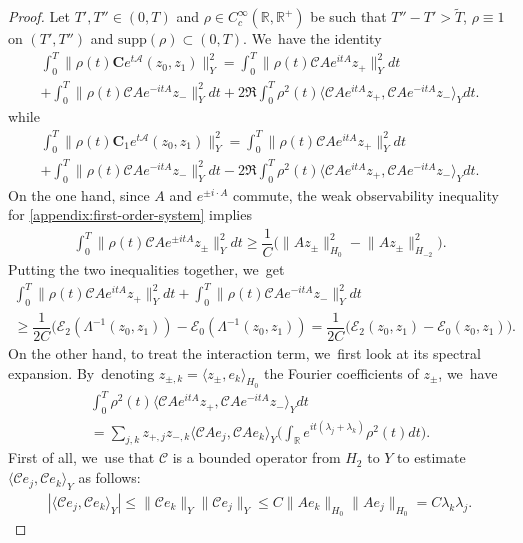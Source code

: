 \documentclass[JEP,XML,SOM,Unicode,published]{cedram}
\theoremstyle{definition}
\let\mc\mathcal
\let\ld\lambda
\newcommand{\A}{\mc{A}}
\newcommand{\E}{\mc{E}}
\newcommand{\R}{\mathbb{R}}
\newcommand{\bC}{\boldsymbol{C}}
\providecommand{\norm}[1]{\lVert#1\rVert}
\providecommand{\inn}[1]{\langle#1\rangle}
\begin{document}
\begin{proof}
Let $T',T'' \in (0,T)$ and $\rho \in C^\infty_c(\mathbb{R},\mathbb{R}^+)$
be such that $T''-T'>\widetilde{T}$, $\rho \equiv 1$ on $(T',T'')$ and $\text{supp}(\rho) \subset (0,T)$. We~have the identity
\begin{multline*}
\int_0^T \norm{\rho(t)\bC e^{t\A}(z_0, z_1)}_{Y}^2=\int_0^T \norm{\rho(t)\mc{C}Ae^{itA}z_+}_{Y}^2dt\\+\int_0^T \norm{\rho(t)\mc{C}Ae^{-itA}z_-}_{Y}^2dt+2\Re\int_0^T \rho^2(t)\inn{\mc{C}Ae^{itA}z_+, \mc{C}Ae^{-itA}z_-}_{Y}dt.
\end{multline*}
while
\begin{multline*}
\int_0^T \norm{\rho(t)\bC_1 e^{t\A}(z_0, z_1)}_{Y}^2=\int_0^T \norm{\rho(t)\mc{C}Ae^{itA}z_+}_{Y}^2dt\\+\int_0^T \norm{\rho(t)\mc{C}Ae^{-itA}z_-}_{Y}^2dt-2\Re\int_0^T \rho^2(t)\inn{\mc{C}Ae^{itA}z_+, \mc{C}Ae^{-itA}z_-}_{Y}dt.
\end{multline*}
On the one hand, since $A$ and $e^{\pm i\cdot A}$ commute, the weak observability inequality for \eqref{appendix:first-order-system} implies
\begin{align*}
\int_0^T \norm{\rho(t)\mc{C}Ae^{\pm itA}z_{\pm}}_{Y}^2dt\geq \dfrac{1}{C}\big(\norm{Az_\pm}_{H_0}^2-\norm{Az_\pm}_{H_{-2}}^2\big).
\end{align*}
Putting the two inequalities together, we~get
\begin{multline*}
\int_0^T \norm{\rho(t)\mc{C}Ae^{itA}z_+}_{Y}^2dt+\int_0^T \norm{\rho(t)\mc{C}Ae^{-itA}z_-}_{Y}^2dt\\
\geq \dfrac{1}{2C}\big(\E_2(\Lambda^{-1}(z_0, z_1))-\E_{0}(\Lambda^{-1}(z_0, z_1))=\dfrac{1}{2C}\big(\E_2(z_0, z_1)-\E_{0}(z_0, z_1)\big).
\end{multline*}
On the other hand, to treat the interaction term, we~first look at its spectral expansion. By~denoting $z_{\pm, k}=\inn{z_{\pm}, e_k}_{H_0}$ the Fourier coefficients of $z_{\pm}$, we~have
\begin{multline*}
\int_0^T \rho^2(t)\inn{\mc{C}Ae^{itA}z_+, \mc{C}Ae^{-itA}z_-}_{Y}dt\\[-5pt]
=\sum_{j, k} z_{+, j}z_{-, k} \inn{\mc{C}Ae_j, \mc{C}Ae_k}_{Y} \biggl(\int_\R e^{it(\ld_j+\ld_k)}\rho^2(t)dt\biggr).
\end{multline*}
First of all, we~use that $\mc{C}$ is a bounded operator from $H_2$ to $Y$ to estimate $\inn{\mc{C}e_j, \mc{C}e_k}_{Y}$ as follows:
\begin{align*}
|\inn{\mc{C}e_j, \mc{C}e_k}_{Y}|\leq \norm{\mc{C}e_k}_{Y}\norm{\mc{C}e_j}_{Y}\leq C\norm{Ae_k}_{H_0}\norm{Ae_j}_{H_0}=C\ld_k\ld_j.

\end{align*}
\end{proof}
\end{document}
